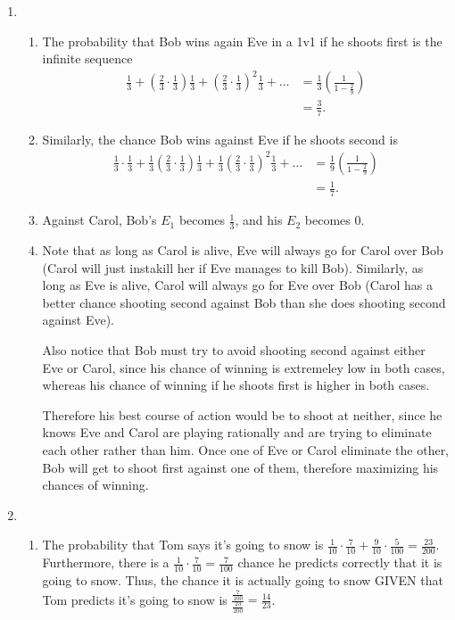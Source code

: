 \begin{enumerate}
    \item \begin{enumerate}
        \item The probability that Bob wins again Eve in a 1v1 if he shoots first is the infinite sequence
        \begin{align*}
        \frac{1}{3} + \left(\frac{2}{3} \cdot \frac{1}{3}\right)\frac{1}{3} + \left(\frac{2}{3} \cdot \frac{1}{3}\right)^2\frac{1}{3} + \ldots &= \frac{1}{3}\left(\frac{1}{1-\frac{2}{9}}\right) \\
        &= \frac{3}{7}.
        \end{align*}
        
        \item Similarly, the chance Bob wins against Eve if he shoots second is
        \begin{align*}
            \frac{1}{3} \cdot \frac{1}{3} + \frac{1}{3}\left(\frac{2}{3} \cdot \frac{1}{3}\right)\frac{1}{3} + \frac{1}{3}\left(\frac{2}{3} \cdot \frac{1}{3}\right)^2\frac{1}{3} + \ldots &= \frac{1}{9}\left(\frac{1}{1 - \frac{2}{9}}\right) \\
            &= \frac{1}{7}.
        \end{align*}
        
        \item Against Carol, Bob's $E_1$ becomes $\frac{1}{3}$, and his $E_2$ becomes $0$.
        
        \item Note that as long as Carol is alive, Eve will always go for Carol over Bob (Carol will just instakill her if Eve manages to kill Bob). Similarly, as long as Eve is alive, Carol will always go for Eve over Bob (Carol has a better chance shooting second against Bob than she does shooting second against Eve).
        
        Also notice that Bob must try to avoid shooting second against either Eve or Carol, since his chance of winning is extremeley low in both cases, whereas his chance of winning if he shoots first is higher in both cases. 
        
        Therefore his best course of action would be to shoot at neither, since he knows Eve and Carol are playing rationally and are trying to eliminate each other rather than him. Once one of Eve or Carol eliminate the other, Bob will get to shoot first against one of them, therefore maximizing his chances of winning.
    \end{enumerate}
    
    \item \begin{enumerate}
        \item The probability that Tom says it's going to snow is $\frac{1}{10} \cdot \frac{7}{10} + \frac{9}{10} \cdot \frac{5}{100} = \frac{23}{200}$. Furthermore, there is a $\frac{1}{10} \cdot \frac{7}{10} = \frac{7}{100}$ chance he predicts correctly that it is going to snow. Thus, the chance it is actually going to snow GIVEN that Tom predicts it's going to snow is $\frac{\frac{7}{100}}{\frac{23}{200}} = \frac{14}{23}$.
        

\end{enumerate}
\end{enumerate}
